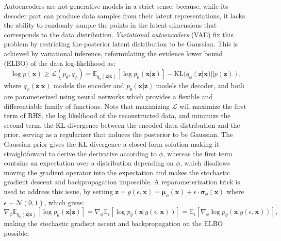 Autoencoders are not generative models in a strict sense, because, while its decoder part can produce data samples from their latent representations, it lacks the ability to randomly sample the points in the latent dimensions that corresponds to the data distribution.
\emph{Variational autoencoders} (VAE) \cite{kingma2013vae} fix this problem by restricting the posterior latent distribution to be Gaussian.
This is achieved by variational inference, reformulating the evidence lower bound (ELBO) of the data log-likelihood as:
\begin{equation}\label{eqn:vae}
\log p(\bm{x}) \ge \mathcal{L}(p_\theta, q_\phi) = \mathbb{E}_{q_\phi(\bm{z}|\bm{x})} [\log p_\theta(\bm{x}|\bm{z})] - \mathrm{KL}(q_\phi(\bm{z}|\bm{x}) || p(\bm{z})),
\end{equation}
where $q_\phi(\bm{z}|\bm{x})$ models the encoder and $p_\theta(\bm{x}|\bm{z})$ models the decoder, and both are parameterized using neural networks which provides a flexible and differentiable family of functions.
Note that maximizing $\mathcal{L}$ will maximize the first term of RHS, the log likelihood of the reconstructed data, and minimize the second term, the KL divergence between the encoded data distribution and the prior, serving as a regularizer that induces the posterior to be Gaussian.
The Gaussian prior gives the KL divergence a closed-form solution making it straightfoward to derive the derivative according to $\phi$, whereas the first term contains an expectation over a distribution depending on $\phi$, which disallows moving the gradient operator into the expectation and makes the stochastic gradient descent and backpropagation impossible.
A reparameterization trick is used to address this issue, by setting $\bm{z} = g({\epsilon}, \bm{x}) = \bm{\mu}_\phi (\bm{x}) + {\epsilon} \cdot \bm{\sigma}_\phi(\bm{x})$ where $\epsilon \sim \mathcal{N}(0, 1)$, which gives:
\begin{equation}\label{eqn:reparam}
\nabla_\phi \mathbb{E}_{q_\phi(\bm{z}|\bm{x})} [\log p_\theta(\bm{x}|\bm{z})] = \nabla_\phi \mathbb{E}_{\epsilon} [\log p_\theta(\bm{x}|g(\epsilon, \bm{x}))] = 
\mathbb{E}_{\epsilon} [\nabla_\phi \log p_\theta(\bm{x}|g(\epsilon, \bm{x}))],
\end{equation}
making the stochastic gradient ascent and backpropagation on the ELBO possible.


